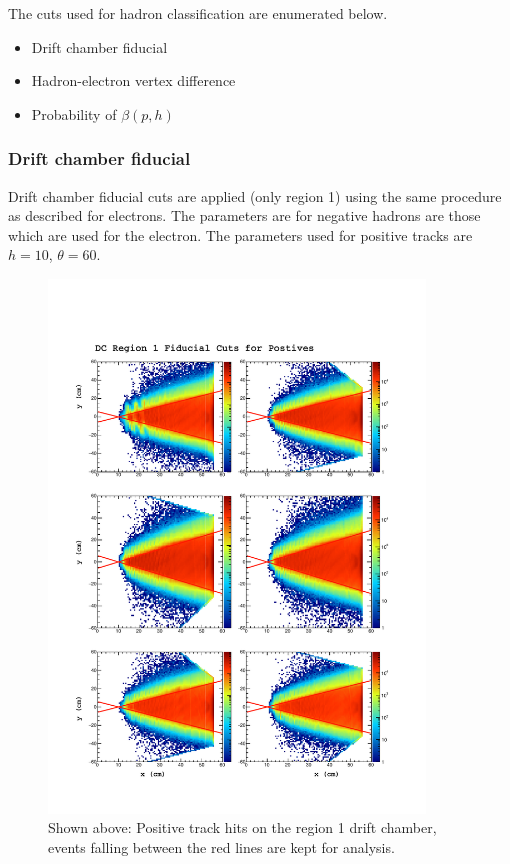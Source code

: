 The cuts used for hadron classification are enumerated below.

\begin{itemize}
  \item{Drift chamber fiducial}
  \item{Hadron-electron vertex difference}
  \item{Probability of $\beta(p,h)$}
\end{itemize}


\subsubsection{Drift chamber fiducial}
Drift chamber fiducial cuts are applied (only region 1) using the same procedure as described for electrons.  The parameters are for negative hadrons are those which are used for the electron.  The parameters used for positive tracks are $h = 10$, $\theta = 60$.

\begin{figure}
  \label{fig:fid}
  \begin{center}
    \includegraphics[width=10cm]{image/plots/hadron-id/fid.pdf}
    \caption{Shown above: Positive track hits on the region 1 drift chamber, events falling between the red lines are kept for analysis.}
  \end{center}
\end{figure}

